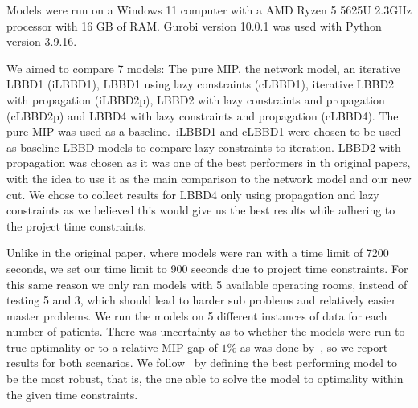 Models were run on a Windows 11 computer with a AMD Ryzen 5 5625U 2.3GHz processor with 16 GB of RAM\@. Gurobi version 10.0.1 was used with Python version 3.9.16. 

We aimed to compare 7 models: The pure MIP, the network model, an iterative LBBD1 (iLBBD1), LBBD1 using lazy constraints (cLBBD1), iterative LBBD2 with propagation (iLBBD2p), LBBD2 with lazy constraints and propagation (cLBBD2p) and LBBD4 with lazy constraints and propagation (cLBBD4). The pure MIP was used as a baseline.\ iLBBD1 and cLBBD1  were chosen to be used as baseline LBBD models to compare lazy constraints to iteration. LBBD2 with propagation was chosen as it was one of the best performers in th original papers, with the idea to use it as the main comparison to the network model and our new cut. We chose to collect results for LBBD4 only using propagation and lazy constraints as we believed this would give us the best results while adhering to the project time constraints.

Unlike in the original paper, where models were ran with a time limit of 7200 seconds, we set our time limit to 900 seconds due to project time constraints. For this same reason we only ran models with 5 available operating rooms, instead of testing 5 and 3, which should lead to harder sub problems and relatively easier master problems\cite{roshanaei2017propagating}. We run the models on 5 different instances of data for each number of patients. There was uncertainty as to whether the models were run to true optimality or to a relative MIP gap of $1\%$ as was done by~\cite{guo}, so we report results for both scenarios. We follow~\cite{roshanaei2017propagating} by defining the best performing model to be the most robust, that is, the one able to solve the model to optimality within the given time constraints.




